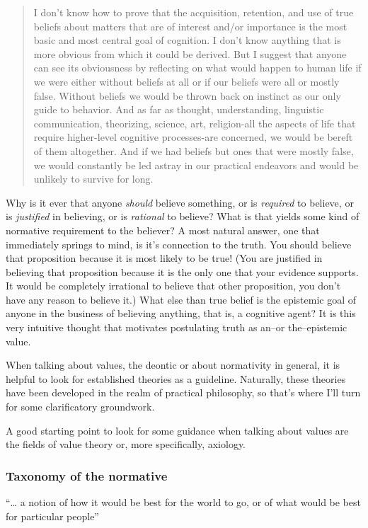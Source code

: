 \documentclass[12pt,numbers=noenddot]{scrartcl}
\begin{document}
\begin{quote}
I don't know how to prove that the acquisition, retention, and use of true beliefs about matters that are of interest and/or importance is the most basic and most central goal of cognition. I don't know anything that is more obvious from which it could be derived. But I suggest that anyone can see its obviousness by reflecting on what would happen to human life if we were either without beliefs at all or if our beliefs were all or mostly false. Without beliefs we would be thrown back on instinct as our only guide to behavior. And as far as thought, understanding, linguistic communication, theorizing, science, art, religion-all the aspects of life that require higher-level cognitive processes-are concerned, we would be bereft of them altogether. And if we had beliefs but ones that were mostly false, we would constantly be led astray in our practical endeavors and would be unlikely to survive for long. \textcite[30]{Alston2005-ALSBJD}
\end{quote}

Why is it ever that anyone \emph{should} believe something, or is \emph{required} to believe, or is \emph{justified} in believing, or is \emph{rational} to believe? What is that yields some kind of normative requirement to the believer? A most natural answer, one that immediately springs to mind, is it's connection to the truth. You should believe that proposition because it is most likely to be true! (You are justified in believing that proposition because it is the only one that your evidence supports. It would be completely irrational to believe that other proposition, you don't have any reason to believe it.) What else than true belief is the epistemic goal of anyone in the business of believing anything, that is, a cognitive agent? It is this very intuitive thought that motivates postulating truth as an–or the–epistemic value.

When talking about values, the deontic or about normativity in general, it is helpful to look for established theories as a guideline. Naturally, these theories have been developed in the realm of practical philosophy, so that's where I'll turn for some clarificatory groundwork.

A good starting point to look for some guidance when talking about values are the fields of value theory or, more specifically, axiology.

\subsubsection{ Taxonomy of the normative}
“… a notion of how it would be best for the world to go, or of what would be best for particular people” \autocite[79]{scanlon1998}
\end{document}
